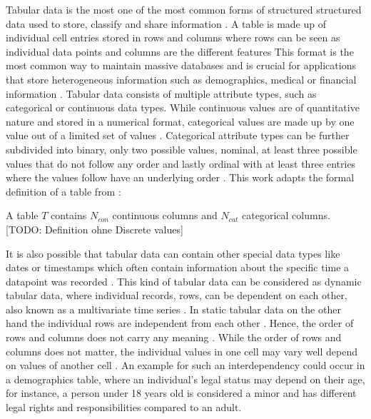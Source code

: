 Tabular data is the most one of the most common forms of structured structured data \cite{hernandez2022SyntheticDataGeneration} used to store, classify and share information \cite{pilaluisa2022ContextualWordEmbeddings}.
A table is made up of individual cell entries stored in rows and columns where rows can be seen as individual data points and columns are the different features \cite{borisov2022DeepNeuralNetworks, yoon2020VIMEExtendingSuccess}
This format is the most common way to maintain massive databases \cite{esmaeilpour2022BidiscriminatorGANTabular, yoon2020VIMEExtendingSuccess} 
and is crucial for applications that store heterogeneous information such as demographics, medical or financial information \cite{borisov2022DeepNeuralNetworks, yoon2020VIMEExtendingSuccess}.
Tabular data consists of multiple attribute types, such as categorical or continuous data types\cite{borisov2022DeepNeuralNetworks}.
While continuous values are of quantitative nature and stored in a numerical format, categorical values are made up by one value out of a limited set of values \cite{lederrey2022DATGANIntegratingExperta, lane2003IntroductionStatistics}.
Categorical attribute types can be further subdivided into binary, only two possible values, nominal, at least three possible values that do not follow any order and lastly ordinal with at least three entries where the values follow have an underlying order \cite{lederrey2022DATGANIntegratingExperta}.
This work adapts the formal definition of a table from \cite{xu2019ModelingTabularData}:

\begin{displayquote}
A table $T$ contains $N_{con}$ continuous columns and $N_{cat}$ categorical columns. [TODO: Definition ohne Discrete values]
\end{displayquote}

It is also possible that tabular data can contain other special data types like dates or timestamps which often contain information about the specific time a datapoint was recorded \cite{hernandez2022SyntheticDataGeneration}.
This kind of tabular data can be considered as dynamic tabular data, where individual records, \ie rows, can be dependent on each other, also known as a multivariate time series \cite{padhi2021TabularTransformersModeling}.
In static tabular data on the other hand the individual rows are independent from each other \cite{padhi2021TabularTransformersModeling}.
Hence, the order of rows and columns does not carry any meaning \cite{somepalli2021SAINTImprovedNeural}.
While the order of rows and columns does not matter, the individual values in one cell may vary well depend on values of another cell \cite{lederrey2022DATGANIntegratingExperta}.
An example for such an interdependency could occur in a demographics table, where an individual's legal status may depend on their age, 
for instance, a person under 18 years old is considered a minor and has different legal rights and responsibilities compared to an adult.

